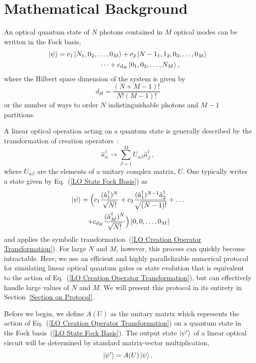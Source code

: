 \documentclass[aps,pra,twocolumn,showpacs,superscriptaddress,floatfix,10pt]{revtex4}
\begin{document}
\section{Mathematical Background}
\label{Intro}
An optical quantum state of $N$ photons contained in $M$ optical modes can be written in the Fock basis,
\begin{eqnarray}
	\label{LO State Fock Basis}
	\ket{\psi} = c_1 \ket{N_1,0_2,\dots,0_M} + c_2 \ket{{N-1}_1,1_2,0_3,\dots, 0_M} \nonumber \\ \dots  + c_{d_H} \ket{0_1,0_2,\dots,N_M},	 \quad \quad \quad \quad
\end{eqnarray}
where the Hilbert space dimension of the system is given by
\begin{equation}
\label{Hilbert Space Dimension}
	d_H = \frac{(N+M-1)!}{N!(M-1)!}
\end{equation}
or the number of ways to order $N$ indistinguishable photons and $M-1$ partitions.

A linear optical operation acting on a quantum state is generally described by the transformation of creation operators~\cite{Review Paper,Reck}:
\begin{equation}
\label{LO Creation Operator Transformation}
\hat{a}^\dagger_\alpha \rightarrow \sum_{\beta=1}^{M} U_{\alpha\beta} \hat{a}^\dagger_\beta \,,
\end{equation}
where $U_{\alpha \beta}$ are the elements of a unitary complex matrix, $U$. One typically writes a state given by Eq.~(\ref{LO State Fock Basis}) as
\begin{eqnarray}
\ket{\psi} = \Big(c_1 \frac{(\hat{a}^\dagger_1)^N}{\sqrt{N!}} + c_2 \frac{ (\hat{a}^\dagger_1)^{N-1} \hat{a}^\dagger_2}{\sqrt{(N-1)!}} + \dots \\* + c_{d_H} \frac{(\hat{a}^\dagger_M)^N}{\sqrt{N!}}\Big) \ket{0,0,\dots,0_M} \quad \quad \nonumber
\end{eqnarray}
and applies the symbolic transformation~(\ref{LO Creation Operator Transformation}). For large $N$ and $M$, however, this process can quickly become intractable. Here, we use an efficient and highly parallelizable numerical protocol for simulating linear optical quantum gates or state evolution that is equivalent to the action of Eq.~(\ref{LO Creation Operator Transformation}), but can effectively handle large values of $N$ and $M$. We will present this protocol in its entirety in Section~\ref{Section on Protocol}.

Before we begin, we define $A(U)$ as the unitary matrix which represents the action of Eq.~(\ref{LO Creation Operator Transformation}) on a quantum state in the Fock basis~(\ref{LO State Fock Basis}). The output state $\ket{\psi^\prime}$ of a linear optical circuit will be determined by standard matrix-vector multiplication,
\begin{equation}
\label{Matrix Vector Product}
\ket{\psi^\prime} = A(U) \ket{\psi}.
\end{equation}
\end{document}
